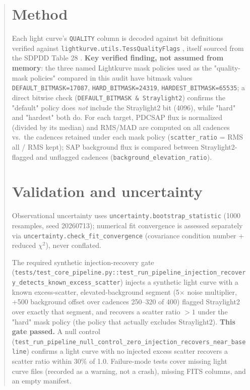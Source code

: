 \documentclass[11pt]{article}
\begin{document}
\begin{abstract}
\section{Method}
\label{sec:method}
Each light curve's \texttt{QUALITY} column is decoded against bit
definitions verified against \texttt{lightkurve.utils.TessQualityFlags}
\citep{LightkurveCollaboration2018}, itself sourced from the SDPDD Table 28
\citep{TESSSDPDD}. \textbf{Key verified finding, not assumed from memory}:
the three named Lightkurve mask policies used as the "quality-mask
policies" compared in this audit have bitmask values
\texttt{DEFAULT\_BITMASK=17087}, \texttt{HARD\_BITMASK=24319},
\texttt{HARDEST\_BITMASK=65535}; a direct bitwise check
(\texttt{DEFAULT\_BITMASK \& Straylight2}) confirms the "default" policy
does \emph{not} include the Straylight2 bit (4096), while "hard" and
"hardest" both do. For each target, PDCSAP flux is normalized
(divided by its median) and RMS/MAD are computed on all cadences vs.\ the
cadences retained under each mask policy (\texttt{scatter\_ratio} = RMS all
/ RMS kept); SAP background flux is compared between Straylight2-flagged
and unflagged cadences (\texttt{background\_elevation\_ratio}).

\section{Validation and uncertainty}
\label{sec:validation}
Observational uncertainty uses \texttt{uncertainty.bootstrap\_statistic}
(1000 resamples, seed 20260713); numerical fit convergence is assessed
separately via \texttt{uncertainty.check\_fit\_convergence} (covariance
condition number + reduced $\chi^2$), never conflated.

The required synthetic injection-recovery gate
(\texttt{tests/test\_core\_pipeline.py::test\_run\_pipeline\_injection\_recovery\_detects\_known\_excess\_scatter})
injects a synthetic light curve with a known excess-scatter,
elevated-background segment (5$\times$ noise multiplier, +500 background
offset over cadences 250--320 of 400) flagged Straylight2 over exactly that
segment, and recovers a scatter ratio $>1$ under the "hard" mask policy
(the policy that actually excludes Straylight2). \textbf{This gate passed.}
A null control
(\texttt{test\_run\_pipeline\_null\_control\_zero\_injection\_recovers\_near\_baseline})
confirms a light curve with no injected excess scatter recovers a scatter
ratio within 30\% of 1.0. Failure-mode tests cover missing light curve
files (recorded as a warning, not a crash), missing FITS columns, and an
empty manifest.


\end{abstract}
\end{document}
